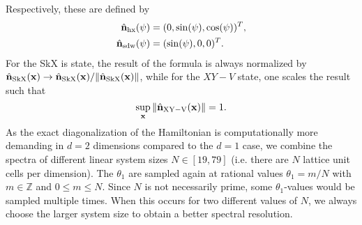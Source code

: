 \documentclass[
    aps,
    prb,
    twocolumn,
    floatfix,
    superscriptaddress,
	10pt
]{revtex4-2}
\begin{document}
Respectively, these are defined by
\begin{align}
\hat{\mathbf{n}}_\mathrm{hx} (\psi) &=  (0, \sin(\psi), \cos(\psi))^T,
\\
\hat{\mathbf{n}}_\mathrm{sdw} (\psi) &=  (\sin(\psi),0,0)^T .
\end{align}
For the SkX is state, the result of the formula is always normalized by
$\hat{\mathbf{n}}_\mathrm{SkX}(\mathbf{x}) \to \hat{\mathbf{n}}_\mathrm{SkX}(\mathbf{x}) / \| \hat{\mathbf{n}}_\mathrm{SkX}(\mathbf{x})\| $, while for the $XY-V$ state, one scales the result such that
\begin{equation}
	\sup_{\mathbf{x}} \| 	\hat{\mathbf{n}}_\mathrm{XY-V}(\mathbf{x}) \| = 1.
\end{equation}	
As the exact diagonalization of the Hamiltonian is computationally more demanding in $d=2$ dimensions compared to the $d=1$ case, we combine the spectra of different linear system sizes $N\in[19, 79]$ (i.e. there are $N$ lattice unit cells per dimension).
The $\theta_1$ are sampled again at rational values $\theta_1 = m /N $ with $m \in \mathbb{Z}$ and $ 0\leq m \leq N$.
Since $N$ is not necessarily prime, some $\theta_1$-values would be sampled multiple times.
When this occurs for two different values of $N$, we always choose the larger system size to obtain a better spectral resolution. 




\end{document}
